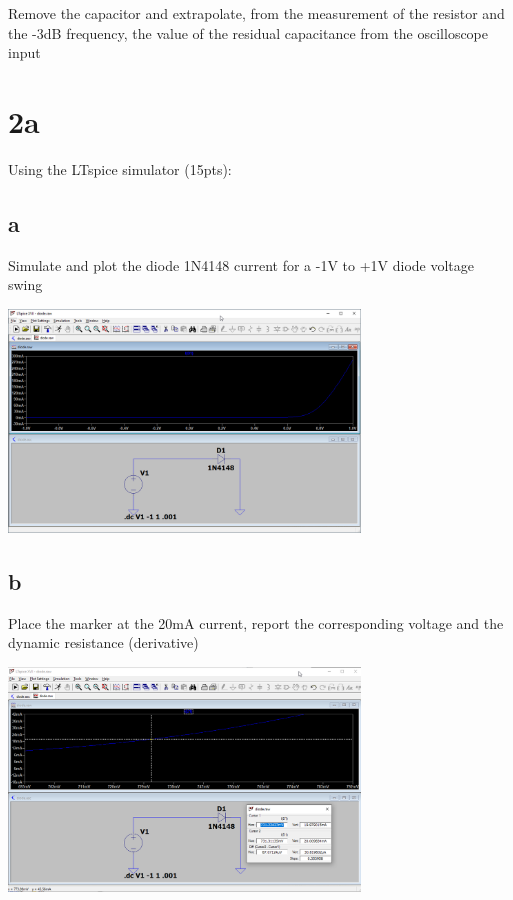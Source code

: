 \documentclass{article}
\begin{document}
	Remove the capacitor and extrapolate, from the measurement of the resistor and the -3dB
	frequency, the value of the residual capacitance from the oscilloscope input
	
	\section*{2a}
	
	Using the LTspice simulator (15pts):
	
	\subsection*{a}
	
	Simulate and plot the diode 1N4148 current for a -1V to +1V diode voltage swing

	\begin{center}
	\includegraphics[width=0.7\textwidth]{diode}
	\end{center}
	
	\subsection*{b}
	
	Place the marker at the 20mA current, report the corresponding voltage and the dynamic resistance (derivative)

	\begin{center}
	\includegraphics[width=0.7\textwidth]{diode-calc}
	\end{center}
	
\end{document}
